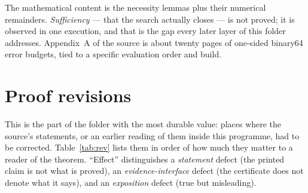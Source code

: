 \documentclass[10pt]{article}
\theoremstyle{definition}
\begin{document}
The mathematical content is the necessity lemmas plus their numerical remainders. \emph{Sufficiency}
--- that the search actually closes --- is not proved; it is observed in one execution, and that is
the gap every later layer of this folder addresses. Appendix~A of the source is about twenty pages of
one-sided binary64 error budgets, tied to a specific evaluation order and build.

\section{Proof revisions}

This is the part of the folder with the most durable value: places where the source's statements,
or an earlier reading of them inside this programme, had to be corrected. Table~\ref{tab:rev} lists
them in order of how much they matter to a reader of the theorem. ``Effect'' distinguishes a
\emph{statement} defect (the printed claim is not what is proved), an \emph{evidence-interface}
defect (the certificate does not denote what it says), and an \emph{exposition} defect (true but
misleading).
\end{document}
